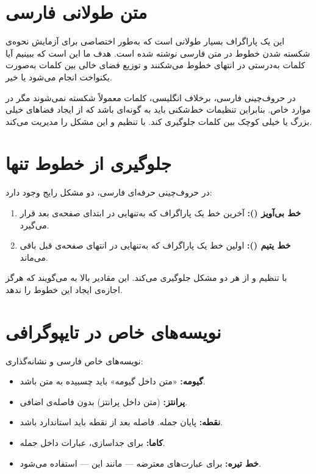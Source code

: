 \documentclass{matinbook}
\begin{document}
\section{متن طولانی فارسی}
\label{sec:typography-longtext}

این یک پاراگراف بسیار طولانی است که به‌طور اختصاصی برای
آزمایش نحوه‌ی شکسته شدن خطوط در متن فارسی نوشته شده است.
هدف ما این است که ببینیم آیا کلمات به‌درستی در انتهای
خطوط می‌شکنند و توزیع فضای خالی بین کلمات به‌صورت یکنواخت
انجام می‌شود یا خیر.

در حروف‌چینی فارسی، برخلاف انگلیسی، کلمات معمولاً شکسته
نمی‌شوند مگر در موارد خاص. بنابراین تنظیمات خط‌شکنی باید
به گونه‌ای باشد که از ایجاد فضاهای خیلی بزرگ یا خیلی کوچک
بین کلمات جلوگیری کند.  با تنظیم
 و
 این مشکل را مدیریت
می‌کند.

\section{جلوگیری از خطوط تنها}
\label{sec:typography-widow}

در حروف‌چینی حرفه‌ای فارسی، دو مشکل رایج وجود دارد:

\begin{enumerate}
    \item \textbf{خط بی‌آویز ():} آخرین خط یک پاراگراف
    که به‌تنهایی در ابتدای صفحه‌ی بعد قرار می‌گیرد.
    \item \textbf{خط یتیم ():} اولین خط یک پاراگراف
    که به‌تنهایی در انتهای صفحه‌ی قبل باقی می‌ماند.
\end{enumerate}

 با تنظیم 
و  از هر دو مشکل
جلوگیری می‌کند. این مقادیر بالا به  می‌گویند
که هرگز اجازه‌ی ایجاد این خطوط را ندهد.

\section{نویسه‌های خاص در تایپوگرافی}
\label{sec:typography-special}

نویسه‌های خاص فارسی و نشانه‌گذاری:

\begin{itemize}
    \item \textbf{گیومه:} «متن داخل گیومه» باید چسبیده به متن باشد.
    \item \textbf{پرانتز:} (متن داخل پرانتز) بدون فاصله‌ی اضافی.
    \item \textbf{نقطه:} پایان جمله. فاصله بعد از نقطه باید
    استاندارد باشد.
    \item \textbf{کاما:} برای جداسازی، عبارات داخل جمله.
    \item \textbf{خط تیره:} برای عبارت‌های معترضه — مانند
    این — استفاده می‌شود.
\end{itemize}
\end{document}
